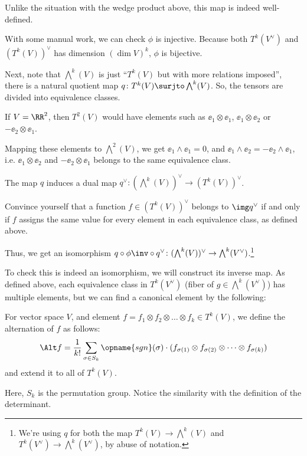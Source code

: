 Unlike the situation with the wedge product above, this map is indeed well-defined.

With some manual work, we can check $\phi$ is injective. Because both $T^k(V^\vee)$ and
$(T^k(V))^\vee$ has dimension $(\dim V)^k$, $\phi$ is bijective.

Next, note that $\bigwedge^k(V)$ is just ``$T^k(V)$ but with more relations imposed'',
there is a natural quotient map $q \colon T^k(V) \surjto \bigwedge^k(V)$.
So, the tensors are divided into equivalence classes.
\begin{example}
	If $V = \RR^2$, then $T^2(V)$ would have elements such as $\ee_1 \otimes \ee_1$, $\ee_1 \otimes
	\ee_2$ or $-\ee_2 \otimes \ee_1$.

	Mapping these elements to $\bigwedge^2(V)$, we get $\ee_1 \wedge \ee_1 = 0$, and $\ee_1 \wedge
	\ee_2 = -\ee_2 \wedge \ee_1$, i.e. $\ee_1 \otimes \ee_2$ and $-\ee_2 \otimes \ee_1$ belongs to
	the same equivalence class.
\end{example}

The map $q$ induces a dual map $q^\vee \colon (\bigwedge^k(V))^\vee \to (T^k(V))^\vee$.
\begin{ques}
	Convince yourself that a function $f \in (T^k(V))^\vee$ belongs to $\img q^\vee$ if and only if
	$f$ assigns the same value for every element in each equivalence class, as defined above.
\end{ques}

Thus, we get an isomorphism $q \circ \phi\inv \circ q^\vee \colon (\bigwedge^k(V))^\vee \to
\bigwedge^k(V^\vee)$.\footnote{We're using $q$ for both the map $T^k(V) \to \bigwedge^k(V)$ and
$T^k(V^\vee) \to \bigwedge^k(V^\vee)$, by abuse of notation.}

To check this is indeed an isomorphism, we will construct its inverse map.
As defined above, each equivalence class in $T^k(V^\vee)$ (fiber of $g \in \bigwedge^k(V^\vee)$)
has multiple elements, but we can find a canonical element by the following:
\begin{definition}
	For vector space $V$, and element $f = f_1 \otimes f_2 \otimes \dots \otimes f_k \in T^k(V)$,
	we define the alternation of $f$ as follows:
	\[ \Alt f = \frac{1}{k!} \sum_{\sigma \in S_k} \opname{sgn}(\sigma) \cdot
	(f_{\sigma(1)} \otimes f_{\sigma(2)} \otimes \dots \otimes f_{\sigma(k)}) \]
	and extend it to all of $T^k(V)$.
\end{definition}
Here, $S_k$ is the permutation group. Notice the similarity with the definition of the determinant.

